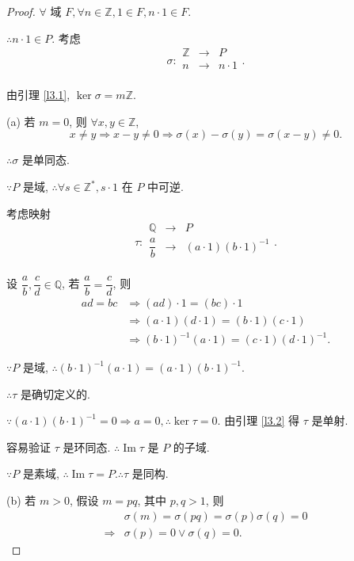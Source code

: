 \documentclass{ctexart}
\begin{document}
\begin{proof}
    $\forall$ 域 $F,\forall n\in\mathbb{Z},1\in F,n\cdot1\in F$.

    $\therefore n\cdot1\in P$. 考虑
    \[\sigma:\begin{array}{rcl}
        \mathbb{Z} & \to & P \\
        n & \to & n\cdot1 \\
    \end{array}.\]

    由引理 \ref{l3.1}, $\ker\sigma=m\mathbb{Z}$.

    (a) 若 $m=0$, 则 $\forall x,y\in\mathbb{Z}$,
    \[x\neq y\Rightarrow x-y\neq0\Rightarrow\sigma (x)-\sigma(y)=\sigma(x-y)\neq0.\]

    $\therefore\sigma$ 是单同态.

    $\because P$ 是域, $\therefore\forall s\in \mathbb{Z}^*,s\cdot1$ 在 $P$ 中可逆.

    考虑映射
    \[\tau:\begin{array}{rcl}
        \mathbb{Q} & \to & P \\[6pt]
        \dfrac{a}{b} & \to & (a\cdot1)(b\cdot1)^{-1} \\
    \end{array}.\]

    设 $\dfrac{a}{b},\dfrac{c}{d}\in\mathbb{Q}$, 若 $\dfrac{a}{b}=\dfrac{c}{d}$, 则
    \begin{align*}
        ad=bc & \Rightarrow(ad)\cdot1=(bc)\cdot1 \\
        & \Rightarrow(a\cdot1)(d\cdot1)=(b\cdot1)(c\cdot1) \\
        & \Rightarrow(b\cdot1)^{-1}(a\cdot1)=(c\cdot1)(d\cdot1)^{-1}.
    \end{align*}

    $\because P$ 是域, $\therefore(b\cdot1)^{-1}(a\cdot1)=(a\cdot1)(b\cdot1)^{-1}$.

    $\therefore\tau$ 是确切定义的.

    $\because(a\cdot1)(b\cdot1)^{-1}=0\Rightarrow a=0,\therefore\ker\tau=0$. 由引理 \ref{l3.2} 得 $\tau$ 是单射.

    容易验证 $\tau$ 是环同态. $\therefore\operatorname{Im}\tau$ 是 $P$ 的子域.

    $\because P$ 是素域, $\therefore\operatorname{Im}\tau=P.\therefore\tau$ 是同构.

    (b) 若 $m>0$, 假设 $m=pq$, 其中 $p,q>1$, 则
    \begin{align*}
        & \sigma(m)=\sigma(pq)=\sigma(p)\sigma(q)=0 \\
        \Rightarrow & \sigma(p)=0\vee\sigma(q)=0.
    \end{align*}


\end{proof}
\end{document}
